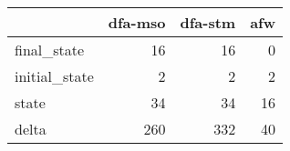 \begin{tabular}{lrrr}
\toprule
{} &  dfa-mso &  dfa-stm &  afw \\
\midrule
final\_state   &       16 &       16 &    0 \\
initial\_state &        2 &        2 &    2 \\
state         &       34 &       34 &   16 \\
delta         &      260 &      332 &   40 \\
\bottomrule
\end{tabular}
